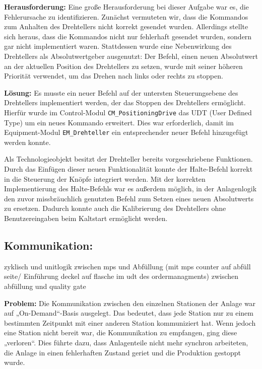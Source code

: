 \textbf{Herausforderung:}  
Eine große Herausforderung bei dieser Aufgabe war es, die Fehlerursache zu identifizieren. Zunächst vermuteten wir, dass die Kommandos zum 
Anhalten des Drehtellers nicht korrekt gesendet wurden. Allerdings stellte sich heraus, dass die Kommandos nicht nur fehlerhaft gesendet wurden, 
sondern gar nicht implementiert waren. Stattdessen wurde eine Nebenwirkung des Drehtellers als Absolutwertgeber ausgenutzt: Der Befehl, einen 
neuen Absolutwert an der aktuellen Position des Drehtellers zu setzen, wurde mit seiner höheren Priorität verwendet, um das Drehen nach links 
oder rechts zu stoppen.  

\textbf{Lösung:}  
Es musste ein neuer Befehl auf der untersten Steuerungsebene des Drehtellers implementiert werden, der das Stoppen des Drehtellers ermöglicht. 
Hierfür wurde im Control-Modul \texttt{CM\_PositioningDrive} das UDT (User Defined Type) um ein neues Kommando erweitert. Dies war erforderlich, 
damit im Equipment-Modul \texttt{EM\_Drehteller} ein entsprechender neuer Befehl hinzugefügt werden konnte.  

Als Technologieobjekt besitzt der Drehteller bereits vorgeschriebene Funktionen. Durch das Einfügen dieser neuen Funktionalität konnte der 
Halte-Befehl korrekt in die Steuerung der Knöpfe integriert werden. Mit der korrekten Implementierung des 
Halte-Befehls war es außerdem möglich, in der Anlagenlogik den zuvor missbräuchlich genutzten Befehl zum Setzen eines neuen Absolutwerts zu 
ersetzen. Dadurch konnte auch die Kalibrierung des Drehtellers ohne Benutzereingaben beim Kaltstart ermöglicht werden.  


\subsection{Kommunikation:} 
zyklisch und unitlogik zwischen mps und Abfüllung (mit mps counter auf abfüll seite/ Einführung deckel auf flasche im udt des ordermanagments)
zwischen abfüllung und quality gate 

\textbf{Problem:}  
Die Kommunikation zwischen den einzelnen Stationen der Anlage war auf „On-Demand“-Basis ausgelegt. Das bedeutet, dass jede Station nur zu 
einem bestimmten Zeitpunkt mit einer anderen Station kommuniziert hat. Wenn jedoch eine Station nicht bereit war, die Kommunikation zu 
empfangen, ging diese „verloren“. Dies führte dazu, dass Anlagenteile nicht mehr synchron arbeiteten, die Anlage in einen fehlerhaften 
Zustand geriet und die Produktion gestoppt wurde.

